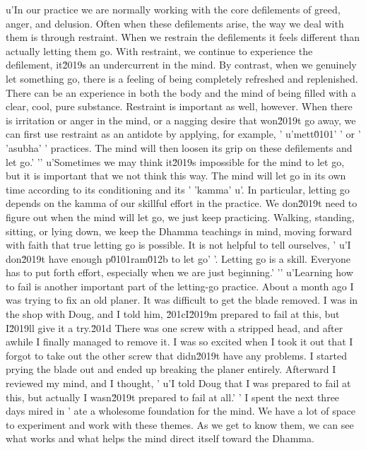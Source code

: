 u'In our practice we are normally working with the core defilements of greed, anger, and delusion. Often when these defilements arise, the way we deal with them is through restraint. When we restrain the defilements it feels different than actually letting them go. With restraint, we continue to experience the defilement, it\u2019s an undercurrent in the mind. By contrast, when we genuinely let something go, there is a feeling of being completely refreshed and replenished. There can be an experience in both the body and the mind of being filled with a clear, cool, pure substance. Restraint is important as well, however. When there is irritation or anger in the mind, or a nagging desire that won\u2019t go away, we can first use restraint as an antidote by applying, for example, '
u'mett\u0101'
' or '
'asubha'
' practices. The mind will then loosen its grip on these defilements and let go.'
'\n'
u'Sometimes we may think it\u2019s impossible for the mind to let go, but it is important that we not think this way. The mind will let go in its own time according to its conditioning and its '
'kamma'
u'. In particular, letting go depends on the kamma of our skillful effort in the practice. We don\u2019t need to figure out when the mind will let go, we just keep practicing. Walking, standing, sitting, or lying down, we keep the Dhamma teachings in mind, moving forward with faith that true letting go is possible. It is not helpful to tell ourselves, '
u'I don\u2019t have enough p\u0101ram\u012b to let go'
'. Letting go is a skill. Everyone has to put forth effort, especially when we are just beginning.'
'\n'
u'Learning how to fail is another important part of the letting-go practice. About a month ago I was trying to fix an old planer. It was difficult to get the blade removed. I was in the shop with Doug, and I told him, \u201cI\u2019m prepared to fail at this, but I\u2019ll give it a try.\u201d There was one screw with a stripped head, and after awhile I finally managed to remove it. I was so excited when I took it out that I forgot to take out the other screw that didn\u2019t have any problems. I started prying the blade out and ended up breaking the planer entirely. Afterward I reviewed my mind, and I thought, '
u'I told Doug that I was prepared to fail at this, but actually I wasn\u2019t prepared to fail at all.'
' I spent the next three days mired in '
ate a wholesome foundation 
for the mind. We have a lot of space to experiment and work with these 
themes. As we get to know them, we can see what works and what helps 
the mind direct itself toward the Dhamma.

